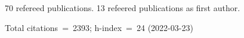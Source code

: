 70 refereed publications. 13 refeered publications as first author.

Total citations~=~2393; h-index~=~24 (2022-03-23)